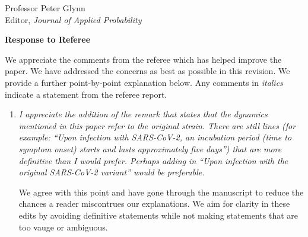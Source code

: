 \documentclass[11pt]{letter} %
\begin{document}

\begin{letter}{Professor
	Peter Glynn\\
	Editor, {\em Journal of Applied Probability}}



\signature{Walter Dempsey\\
University of Michigan\\
Department of Biostatistics\\
1415 Washington Heights\\
Ann Arbor, MI 48103} %


\vspace{5mm}

\newpage

{\bf Response to Referee}

We appreciate the comments from the referee which has helped improve the paper. We have addressed the concerns as best as possible in this revision. We provide a further point-by-point explanation below. Any comments in {\it italics} indicate a statement from the referee report.

\begin{enumerate}
\item {\it I appreciate the addition of the remark that states that the dynamics mentioned in this paper refer to the original strain. There are still lines (for example: “Upon infection with SARS-CoV-2, an incubation period (time to symptom onset) starts and lasts approximately five days”) that are more definitive than I would prefer. Perhaps adding in “Upon infection with the original SARS-CoV-2 variant” would be preferable.}

\vspace{5mm}
We agree with this point and have gone through the manuscript to reduce the chances a reader miscontrues our explanations. We aim for clarity in these edits by avoiding definitive statements while not making statements that are too vauge or ambiguous.
\vspace{5mm}


\end{enumerate}
\end{letter}
\end{document}
